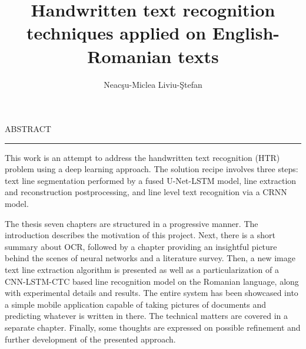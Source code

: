 \documentclass[12pt]{report}
\begin{document}
\title{Handwritten text recognition techniques applied on English-Romanian texts}
\author{Neac\c{s}u-Miclea Liviu-\c{S}tefan}

\maketitle


\newpage
\thispagestyle{empty}
\mbox{}
\newpage
{} 

\cleardoublepage
ABSTRACT
\vspace{0.5cm}	
\hrule
\vspace{0.5cm}	

This work is an attempt to address the handwritten text recognition (HTR) problem using a deep learning approach. The solution recipe involves three steps: text line segmentation performed by a fused U-Net-LSTM model, line extraction and reconstruction postprocessing, and line level text recognition via a CRNN model.

The thesis seven chapters are structured in a progressive manner. The introduction describes the motivation of this project. Next, there is a short summary about OCR, followed by a chapter providing an insightful picture behind the scenes of neural networks and a literature survey. Then, a new image text line extraction algorithm is presented as well as a particularization of a CNN-LSTM-CTC based line recognition model on the Romanian language, along with experimental details and results. The entire system has been showcased into a simple mobile application capable of taking pictures of documents and predicting whatever is written in there. The technical matters are covered in a separate chapter. Finally, some thoughts are expressed on possible refinement and further development of the presented approach.

\tableofcontents

\newpage
{}













\end{document}
